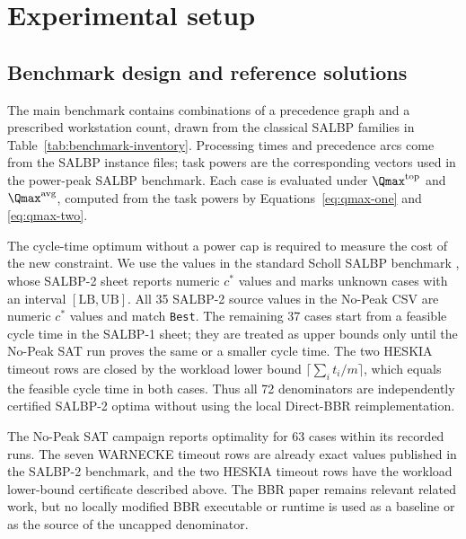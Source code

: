 \section{Experimental setup}

\subsection{Benchmark design and reference solutions}

The main benchmark contains \MainInstanceCount{} combinations of a precedence
graph and a prescribed workstation count, drawn from the
\MainFamilyCount{} classical SALBP families in
Table~\ref{tab:benchmark-inventory}. Processing times and precedence arcs come
from the SALBP instance files; task powers are the corresponding vectors used
in the power-peak SALBP benchmark. Each case is evaluated under
\(\Qmax^{\mathrm{top}}\) and \(\Qmax^{\mathrm{avg}}\), computed from the task
powers by Equations~\eqref{eq:qmax-one} and \eqref{eq:qmax-two}.



The cycle-time optimum without a power cap is required to measure the cost of
the new constraint. We use the values in the standard Scholl SALBP benchmark
\citep{SchollBenchmark1993}, whose
SALBP-2 sheet reports numeric \(c^*\) values and marks unknown
cases with an interval \([\mathrm{LB},\mathrm{UB}]\). All 35 SALBP-2 source
values in the No-Peak CSV are numeric \(c^*\) values and match \texttt{Best}.
The remaining 37 cases start from a feasible cycle time in the SALBP-1 sheet;
they are treated as upper bounds only until the No-Peak SAT run proves the
same or a smaller cycle time. The two HESKIA timeout rows are closed by the
workload lower bound \(\lceil\sum_i t_i/m\rceil\), which equals the feasible
cycle time in both cases. Thus all 72 denominators are independently
certified SALBP-2 optima without using the local Direct-BBR reimplementation.



The No-Peak SAT campaign reports optimality for 63 cases within its recorded
runs. The seven WARNECKE timeout rows are already exact values published in
the SALBP-2 benchmark, and the two HESKIA timeout rows have the workload
lower-bound certificate described above. The BBR paper remains relevant
related work, but no locally modified BBR executable or runtime is used as a
baseline or as the source of the uncapped denominator.

